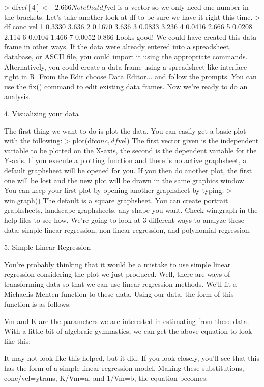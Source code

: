 > df$vel[4] <- 2.666
Note that df$vel is a vector so we only need one number in the brackets. Let's take another look at df to be sure we have it right this time. 
> df
    conc   vel 
1 0.3330 3.636
2 0.1670 3.636
3 0.0833 3.236
4 0.0416 2.666
5 0.0208 2.114
6 0.0104 1.466
7 0.0052 0.866
Looks good! We could have created this data frame in other ways. If the data were already entered into a spreadsheet, database, or ASCII file, you could import it using the appropriate commands. Alternatively, you could create a data frame using a spreadsheet-like interface right in R. From the Edit choose Data Editor... and follow the prompts. You can use the fix() command to edit existing data frames. 
Now we're ready to do an analysis.

4. Visualizing your data


The first thing we want to do is plot the data. You can easily get a basic plot with the following:
> plot(df$conc, df$vel)
The first vector given is the independent variable to be plotted on the X-axis, the second is the dependent variable for the Y-axis. If you execute a plotting function and there is no active graphsheet, a default graphsheet will be opened for you. If you then do another plot, the first one will be lost and the new plot will be drawn in the same graphics window. You can keep your first plot by opening another graphsheet by typing: 
> win.graph()
The default is a square graphsheet. You can create portrait graphsheets, landscape graphsheets, any shape you want. Check win.graph in the help files to see how. 
We're going to look at 3 different ways to analyze these data: simple linear regression, non-linear regression, and polynomial regression. 

5. Simple Linear Regression


You're probably thinking that it would be a mistake to use simple linear regression considering the plot we just produced. Well, there are ways of transforming data so that we can use linear regression methods. We'll fit a Michaelis-Menten function to these data. Using our data, the form of this function is as follows: 

Vm and K are the parameters we are interested in estimating from these data. With a little bit of algebraic gymnastics, we can get the above equation to look like this: 

It may not look like this helped, but it did. If you look closely, you'll see that this has the form of a simple linear regression model. Making these substitutions, conc/vel=ytrans, K/Vm=a, and 1/Vm=b, the equation becomes: 

